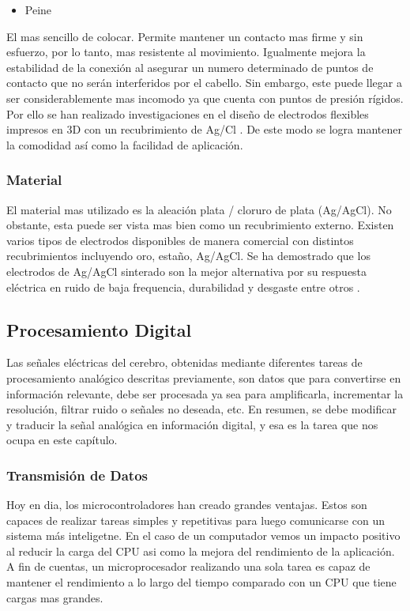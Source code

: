 \begin{itemize}
\item Peine\\
\end{itemize}
El mas sencillo de colocar. Permite mantener un contacto mas firme y sin esfuerzo, por lo tanto, mas resistente al movimiento. Igualmente mejora la estabilidad de la conexión al asegurar un numero determinado de puntos de contacto que no serán interferidos por el cabello. Sin embargo, este puede llegar a ser considerablemente mas incomodo ya que cuenta con puntos de presión rígidos. Por ello se han realizado investigaciones en el diseño de electrodos flexibles impresos en 3D con un recubrimiento de Ag/Cl \cite{Krachunov2016,Rohaizad2019}. De este modo se logra mantener la comodidad así como la facilidad de aplicación.\\

\subsubsection{Material}
\label{sec:org8ef06d6}
El material mas utilizado es la aleación plata / cloruro de plata (Ag/AgCl). No obstante, esta puede ser vista mas bien como un recubrimiento externo. Existen varios tipos de electrodos disponibles de manera comercial con distintos recubrimientos incluyendo oro, estaño, Ag/AgCl. Se ha demostrado que los electrodos de Ag/AgCl sinterado son la mejor alternativa por su respuesta eléctrica en ruido de baja frequencia, durabilidad y desgaste entre otros \cite{Tallgren2005}.\\

\subsection{Procesamiento Digital}
\label{sec:org1bbf3f5}
Las señales eléctricas del cerebro, obtenidas mediante diferentes tareas de procesamiento analógico descritas previamente, son datos que para convertirse en información relevante, debe ser procesada ya sea para amplificarla, incrementar la resolución, filtrar ruido o señales no deseada, etc. En resumen, se debe modificar y traducir la señal analógica en información digital, y esa es la tarea que nos ocupa en este capítulo.\\

\subsubsection{Transmisión de Datos}
\label{sec:org153de2a}
Hoy en dia, los microcontroladores han creado grandes ventajas. Estos son capaces de realizar tareas simples y repetitivas para luego comunicarse con un sistema más inteligetne. En el caso de un computador vemos un impacto positivo al reducir la carga del CPU asi como la mejora del rendimiento de la aplicación. A fin de cuentas, un microprocesador realizando una sola tarea es capaz de mantener el rendimiento a lo largo del tiempo comparado con un CPU que tiene cargas mas grandes.\\

